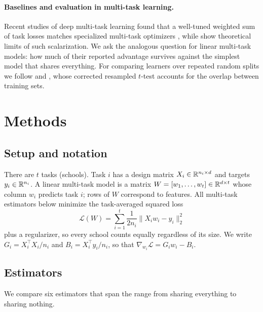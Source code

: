\paragraph{Baselines and evaluation in multi-task learning.}
Recent studies of deep multi-task learning found that a well-tuned weighted sum of task losses matches specialized multi-task optimizers \citep{xin2022current, kurin2022defense}, while \citet{hu2023revisiting} show theoretical limits of such scalarization. We ask the analogous question for linear multi-task models: how much of their reported advantage survives against the simplest model that shares everything. For comparing learners over repeated random splits we follow \citet{dietterich1998approximate} and \citet{nadeau2003inference}, whose corrected resampled $t$-test accounts for the overlap between training sets.

\section{Methods}
\label{sec:methods}

\subsection{Setup and notation}
There are $t$ tasks (schools). Task $i$ has a design matrix $X_i \in \mathbb{R}^{n_i \times d}$ and targets $y_i \in \mathbb{R}^{n_i}$. A linear multi-task model is a matrix $W = [w_1, \dots, w_t] \in \mathbb{R}^{d \times t}$ whose column $w_i$ predicts task $i$; rows of $W$ correspond to features. All multi-task estimators below minimize the task-averaged squared loss
\begin{equation}
  \mathcal{L}(W) = \sum_{i=1}^{t} \frac{1}{2 n_i} \lVert X_i w_i - y_i \rVert_2^2
  \label{eq:loss}
\end{equation}
plus a regularizer, so every school counts equally regardless of its size. We write $G_i = X_i^\top X_i / n_i$ and $B_i = X_i^\top y_i / n_i$, so that $\nabla_{w_i} \mathcal{L} = G_i w_i - B_i$.

\subsection{Estimators}
We compare six estimators that span the range from sharing everything to sharing nothing.

